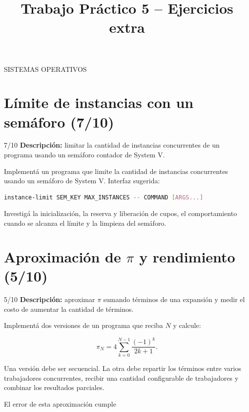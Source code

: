 \documentclass[11pt,a4paper]{article}
\title{Trabajo Práctico 5 -- Ejercicios extra}
\author{}
\date{}
\begin{document}
\renewcommand{\contentsname}{Tracks}
\maketitle
\thispagestyle{fancy}
\begin{center}
SISTEMAS OPERATIVOS
\end{center}
\newpage

\tableofcontents
\newpage

\section{Límite de instancias con un semáforo (7/10)}

\begin{trackbox}{7/10}
\textbf{Descripción:} limitar la cantidad de instancias concurrentes de un
programa usando un semáforo contador de System V.
\end{trackbox}

Implementá un programa que limite la cantidad de instancias concurrentes usando
un semáforo de System V. Interfaz sugerida:

\begin{lstlisting}[language=bash]
instance-limit SEM_KEY MAX_INSTANCES -- COMMAND [ARGS...]
\end{lstlisting}

Investigá la inicialización, la reserva y liberación de cupos, el
comportamiento cuando se alcanza el límite y la limpieza del semáforo.

\newpage
\section{Aproximación de $\pi$ y rendimiento (5/10)}

\begin{trackbox}{5/10}
\textbf{Descripción:} aproximar $\pi$ sumando términos de una expansión y
medir el costo de aumentar la cantidad de términos.
\end{trackbox}

Implementá dos versiones de un programa que reciba $N$ y calcule:

\[
\pi_N = 4 \sum_{k=0}^{N-1} \frac{(-1)^k}{2k+1}.
\]

Una versión debe ser secuencial. La otra debe repartir los términos entre
varios trabajadores concurrentes, recibir una cantidad configurable de
trabajadores y combinar los resultados parciales.

El error de esta aproximación cumple
\end{document}
